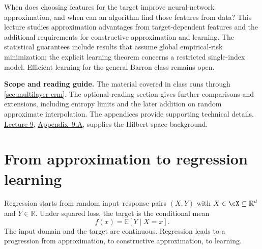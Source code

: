 \documentclass[11pt,twoside]{article}
\newcommand{\E}{\mathbb E}
\newcommand{\R}{\mathbb R}
\theoremstyle{definition}
\theoremstyle{remark}
\begin{document}
\begin{center}
\end{center}

When does choosing features for the target improve neural-network
approximation, and when can an algorithm find those features from data?
This lecture studies approximation advantages from target-dependent features
and the additional requirements for constructive approximation and learning.
The statistical guarantees include results that assume global empirical-risk
minimization; the explicit learning theorem concerns a restricted
single-index model. Efficient learning for the general Barron class remains
open.

\noindent\textbf{Scope and reading guide.}
The material covered in class runs through \cref{sec:multilayer-erm}.
The optional-reading section gives further comparisons and extensions,
including entropy limits and the later addition on random approximate
interpolation. The appendices provide supporting technical details.
\href{lecture09.pdf}{Lecture 9},
\href{lecture09.pdf\#nameddest=appendix.A}{Appendix~9.A}, supplies the
Hilbert-space background.

\section{From approximation to regression learning}
\label{sec:questions}

Regression starts from random input--response pairs $(X,Y)$ with
$X\in\cX\subseteq\R^d$ and $Y\in\R$. Under squared loss, the target is the
conditional mean
\[
 f(x)=\E[Y\mid X=x].
\]
The input domain and the target are continuous. Regression leads to a
progression from approximation, to constructive approximation, to learning.
\end{document}

